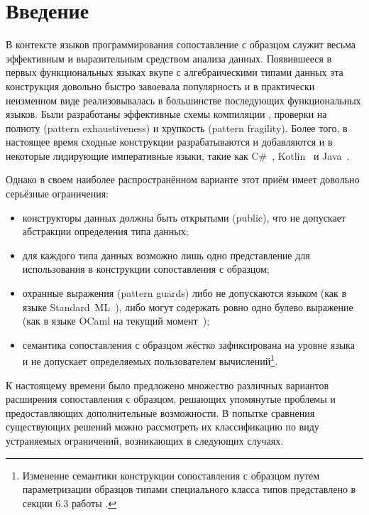\section*{Введение}
В контексте языков программирования сопоставление с образцом служит весьма эффективным и выразительным средством анализа данных. Появившееся в первых функциональных языках вкупе с алгебраическими типами данных эта конструкция довольно быстро завоевала популярность и в практически неизменном виде реализовывалась в большинстве последующих функциональных языков. Были разработаны эффективные схемы компиляции \cite{fessant2001optimizing, maranget2008decisiontrees, scott2000whendo}, проверки на полноту (pattern exhaus\-ti\-ve\-ness) \cite{maranget2007warnings} и хрупкость (pattern fragility). Более того, в настоящее время сходные конструкции разрабатываются и добавляются и в некоторые лидирующие императивные языки, такие как C\#~\cite{csharp2019pattern_matching}, Kotlin~\cite{kotlin2019when_expression} и Java~\cite{java2019proposal}. 

Однако в своем наиболее распространённом варианте этот приём имеет довольно серьёзные ограничения: 

\begin{itemize}
  \item конструкторы данных должны быть открытыми (public), что не допускает абстракции определения типа данных; 
  \item для каждого типа данных возможно лишь одно представление для использования в конструкции сопоставления с образцом; 
  \item охранные выражения (pattern guards) либо не допускаются языком (как в языке Standard~ML~\cite{milner1997definition}), либо могут содержать ровно одно булево выражение (как в языке OCaml на текущий момент~\cite{leroy2019manual});
  \item семантика сопоставления с образцом жёстко зафиксирована на уровне языка и не допускает определяемых пользователем вычислений\footnote{Изменение семантики конструкции сопоставления с образцом путем параметризации образцов типами специального класса типов представлено в секции 6.3 работы \cite{syme2007extensible}.}.
\end{itemize}

К настоящему времени было предложено множество различных вариантов расширения сопоставления с образцом, решающих упомянутые проблемы и предоставляющих дополнительные возможности. В попытке сравнения существующих решений можно рассмотреть их классификацию по виду устраняемых ограничений, возникающих в следующих случаях. 

